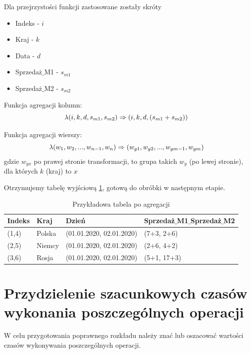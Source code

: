 \documentclass[brudnopis]{xmgr}
\begin{document}
Dla przejrzystości funkcji zastosowane zostały skróty

\begin{itemize}
    \item Indeks - $i$
    \item Kraj - $k$
    \item Data - $d$
    \item Sprzedaż$\_$M1 - $s_{m1}$
    \item Sprzedaż$\_$M2 - $s_{m2}$
\end{itemize}

Funkcja agregacji kolumn:
\begin{equation} \label{eq:example-col-agg}
\lambda (i, k, d, s_{m1}, s_{m2}) \\ \Rightarrow (i, k, d, (s_{m1}+s_{m2}))
\end{equation}

Funkcja agregacji wierszy:
\begin{equation} \label{eq:example-row-agg}
\lambda (w_1, w_2, ..., w_{n-1}, w_n) \\ \Rightarrow (w_{g1}, w_{g2}, ..., w_{gm-1}, w_{gm}) 
\end{equation}
gdzie $w_{gx}$ po prawej stronie transformacji, to grupa takich $w_y$ (po lewej stronie), dla których $k$ (kraj) to $x$

Otrzymujemy tabelę wyjściową \ref{tab:example-output}, gotową do obróbki w następnym etapie.

\begin{table}[!tbh]
\begin{tabular}{|l|l|l|l|} \hline
Indeks & Kraj & Dzień & Sprzedaż$\_$M1$\_$Sprzedaż$\_$M2 \\ \hline
(1,4) & Polska & (01.01.2020, 02.01.2020) & (7+3, 2+6) \\ \hline
(2,5) & Niemcy & (01.01.2020, 02.01.2020) & (2+6, 4+2) \\ \hline
(3,6) & Rosja & (01.01.2020, 02.01.2020) & (5+1, 17+3) \\ \hline
\end{tabular}
\caption{Przykładowa tabela po agregacji\label{tab:example-output}}
\end{table}

\newpage
\section{Przydzielenie szacunkowych czasów wykonania poszczególnych operacji}

W celu przygotowania poprawnego rozkładu należy znać lub oszacować wartości czasów wykonywania poszczególnych operacji.
\end{document}
